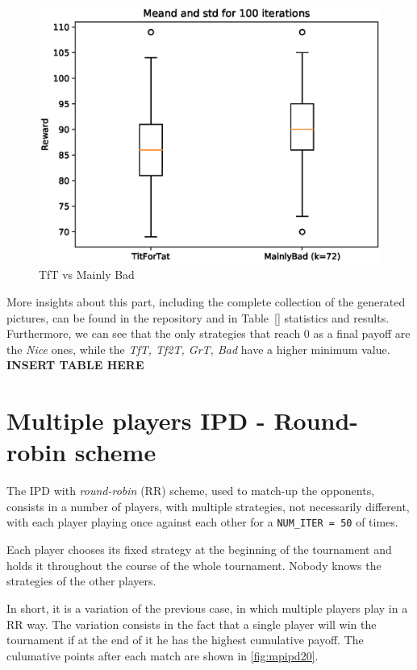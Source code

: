 \documentclass[journal,a4paper,10pt,twoside]{IEEEtran} %
\begin{document}
\begin{figure}[!ht]
    \centering
    \includegraphics[width=1\columnwidth]{../img/ipd2p/ipd2p-boxplot-TitForTat-MainlyBad(k=72)}
    \caption{TfT vs Mainly Bad}
    \label{fig:boxmbvtft}
\end{figure}

More insights about this part, including the complete collection of the generated pictures, can be found in the repository and in Table~\ref{} statistics and results. Furthermore, we can see that the only strategies that reach $0$ as a final payoff are the \textit{Nice} ones, while the \textit{TfT, Tf2T, GrT, Bad} have a higher minimum value.
\textbf{INSERT TABLE HERE}

\section{Multiple players IPD - Round-robin scheme} \label{s:IPDMP}
The IPD with \textit{round-robin} (RR) scheme, used to match-up the opponents, consists in a number of players, with multiple strategies, not necessarily different, with each player playing once against each other for a \texttt{NUM\_ITER = 50} of times.

Each player chooses its fixed strategy at the beginning of the tournament and holds it throughout the course of the whole tournament. Nobody knows the strategies of the other players.

In short, it is a variation of the previous case, in which multiple players play in a RR way. The variation consists in the fact that a single player will win the tournament if at the end of it he has the highest cumulative payoff. The culumative points after each match are shown in \autoref{fig:mpipd20}.
\end{document}
